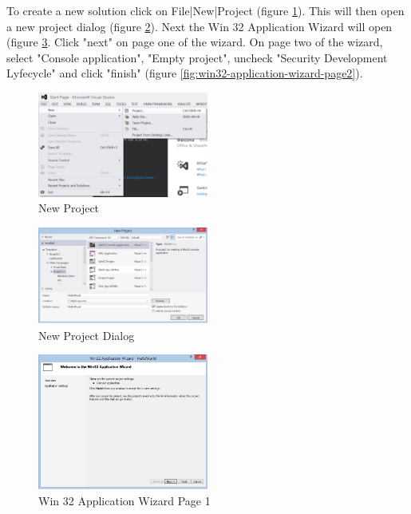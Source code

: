 To create a new solution click on File|New|Project (figure \ref{fig:new-project}). 
This will then open a new project dialog (figure  \ref{fig:new-project-dialog}).
Next the Win 32 Application Wizard will open (figure \ref{fig:win32-application-wizard-page1}.
Click "next" on page one of the  wizard. 
On page two of the wizard, select "Console application", "Empty project", uncheck "Security Development Lyfecycle" and click "finish" (figure \ref{fig:win32-application-wizard-page2}).
\begin{figure}
  \centering
  \includegraphics[width=0.5\textwidth]{diagrams/new_project.pdf}
  \caption{New Project}\label{fig:new-project}
\end{figure}
\begin{figure}
  \centering
  \includegraphics[width=0.5\textwidth]{diagrams/new_project_dialog.pdf}
  \caption{New Project Dialog}\label{fig:new-project-dialog}
\end{figure}
\begin{figure}
  \centering
  \includegraphics[width=0.5\textwidth]{diagrams/win32_application_wizard_page1.pdf}
  \caption{Win 32 Application Wizard Page 1}\label{fig:win32-application-wizard-page1}
\end{figure}
